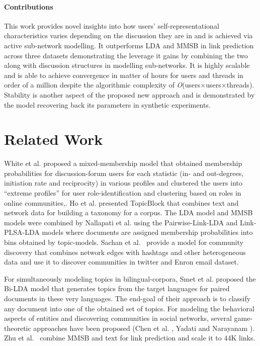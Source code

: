\documentclass{sig-alternate}
\newcommand{\order}[1]{\textit{O}(#1)}
\begin{document}
\paragraph{Contributions} This work provides novel insights
into how users' self-representational characteristics varies
depending on the discussion they are in and is achieved via active sub-network
modelling.
It outperforms LDA and MMSB in link prediction across three datasets
demonstrating the leverage it gains by combining the two along with discussion
structures in modelling sub-networks.
It is highly scalable and is able to achieve convergence in
matter of hours for users and threads in order of a million despite the
algorithmic complexity of \order{users$\times$users$\times$threads}. Stability
is another aspect of the proposed new approach and is demonstrated by
the model recovering back its parameters in synthetic experiments. 




\section{Related Work}

White et al.\cite{ICWSM124638} proposed a mixed-membership model that obtained
membership probabilities for discussion-forum users for each statistic
(in- and out-degrees, initiation rate and reciprocity) in various profiles and
clustered the users into ``extreme profiles'' for user role-identification
and clustering based on roles in online communities,. Ho et al.
\cite{Ho:2012:DHT:2187836.2187936} presented TopicBlock that combines text and
network data for building a taxonomy for a corpus.
The LDA model and MMSB models were combined by
Nallapati et al. \cite{Nallapati:2008:JLT:1401890.1401957} using the
Pairwise-Link-LDA and Link-PLSA-LDA models where documents are assigned
membership probabilities into bins obtained by topic-models. Sachan et
al.~\cite{Sachan:2012:UCI:2187836.2187882} provide a model for community
discovery that combines network edges with hashtags and other heterogeneous data
and use it to discover communities in twitter and Enron email dataset.

For simultaneously modeling topics in bilingual-corpora, Smet et al.
\cite{Smet:2011:KTA:2017863.2017915} proposed the Bi-LDA model that generates
topics from the target languages for paired documents in these very languages.
The end-goal of their approach is to classify any document into one of the
obtained set of topics. For modeling the behavioral aspects of entities and
discovering communities in social networks, several game-theoretic approaches
have been proposed (Chen et al. \cite{Chen:2010:GFI:1842547.1842566}, Yadati and
Narayanam \cite{Yadati:2011:GTM:1963192.1963316}). Zhu et
al.~\cite{Zhu:getoor:MMSB-text} combine MMSB and text for link prediction and
scale it to 44K links.
\end{document}
